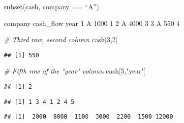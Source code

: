 \documentclass[]{article}
\newenvironment{Shaded}{\begin{snugshade}}{\end{snugshade}}
\newcommand{\DecValTok}[1]{\textcolor[rgb]{0.00,0.00,0.81}{#1}}
\newcommand{\StringTok}[1]{\textcolor[rgb]{0.31,0.60,0.02}{#1}}
\newcommand{\CommentTok}[1]{\textcolor[rgb]{0.56,0.35,0.01}{\textit{#1}}}
\newcommand{\OtherTok}[1]{\textcolor[rgb]{0.56,0.35,0.01}{#1}}
\newcommand{\OperatorTok}[1]{\textcolor[rgb]{0.81,0.36,0.00}{\textbf{#1}}}
\newcommand{\NormalTok}[1]{#1}
\begin{document}
subset(cash, company == ``A'')

company cash\_flow year 1 A 1000 1 2 A 4000 3 3 A 550 4

\begin{Shaded}
\begin{Highlighting}[]
\CommentTok{# Third row, second column}
\NormalTok{cash[}\DecValTok{3}\NormalTok{,}\DecValTok{2}\NormalTok{]}
\end{Highlighting}
\end{Shaded}

\begin{verbatim}
## [1] 550
\end{verbatim}

\begin{Shaded}
\begin{Highlighting}[]
\CommentTok{# Fifth row of the "year" column}
\NormalTok{cash[}\DecValTok{5}\NormalTok{,}\StringTok{"year"}\NormalTok{]}
\end{Highlighting}
\end{Shaded}

\begin{verbatim}
## [1] 2
\end{verbatim}

\begin{Shaded}
\end{Shaded}

\begin{verbatim}
## [1] 1 3 4 1 2 4 5
\end{verbatim}

\begin{Shaded}
\end{Shaded}

\begin{verbatim}
## [1]  2000  8000  1100  3000  2200  1500 12000
\end{verbatim}

\begin{Shaded}
\end{Shaded}
\end{document}
